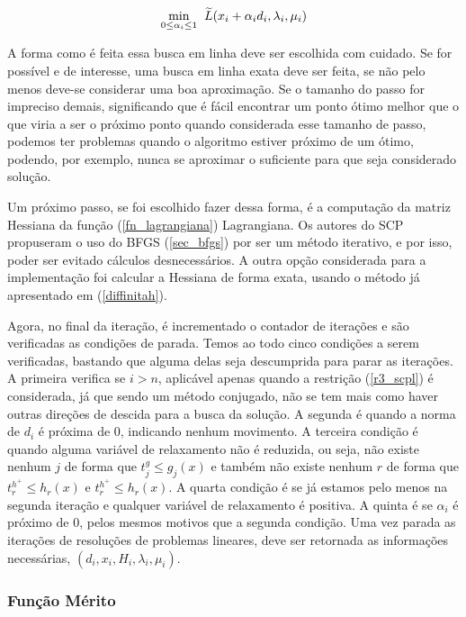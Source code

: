 \begin{equation}
  \underset{0\leq \alpha_i \leq 1}{\mathrm{min}}\hspace{0.2cm}  \widetilde{L}(x_i + \alpha_i d_i, \lambda_i, \mu_i)
\end{equation}

A forma como é feita essa busca em linha deve ser escolhida com cuidado. Se
for possível e de interesse, uma busca em linha exata deve ser feita, se não
pelo menos deve-se considerar uma boa aproximação. Se o tamanho do passo for
impreciso demais, significando que é fácil encontrar um ponto ótimo melhor que o que
viria a ser o próximo ponto quando considerada esse tamanho de passo, podemos
ter problemas quando o algoritmo estiver próximo de um ótimo, podendo, por
exemplo, nunca se aproximar o suficiente para que seja considerado solução.

Um próximo passo, se foi escolhido fazer dessa forma, é a computação
da matriz Hessiana da função (\ref{fn_lagrangiana}) Lagrangiana. Os autores do
SCP propuseram o uso do BFGS (\ref{sec_bfgs}) por ser um método iterativo, e
por isso, poder ser evitado cálculos desnecessários. A outra opção considerada
para a implementação foi calcular a Hessiana de forma exata, usando o método
já apresentado em (\ref{diffinitah}).




Agora, no final da iteração, é incrementado o contador de iterações e são verificadas
as condições de parada. Temos ao todo cinco condições a serem verificadas, bastando
que alguma delas seja descumprida para parar as iterações. A primeira verifica se
\(i > n\), aplicável apenas quando a restrição (\ref{r3_scpl}) é considerada, já
que sendo um método conjugado, não se tem mais como haver outras direções de descida
para a busca da solução. A segunda é quando a norma de \(d_i\) é próxima de 0, indicando
nenhum movimento. A terceira condição é quando alguma variável de relaxamento não é
reduzida, ou seja, não existe nenhum \(j\) de forma que \(t^g_j \leq g_j(x)\) e
também não existe nenhum \(r\) de forma que
\(t^{h^+}_r \leq h_r(x)\) e  \(t^{h^+}_r \leq h_r(x)\). A quarta condição é se já estamos
pelo menos na segunda iteração e qualquer variável de relaxamento é positiva. A quinta
é se \(\alpha_i\) é próximo de 0, pelos mesmos motivos que a segunda condição. Uma vez
parada as iterações de resoluções de problemas lineares, deve ser retornada as informações
necessárias, \((d_i, x_i, H_i, \lambda_i, \mu_i)\).

\subsubsection{Função Mérito}

